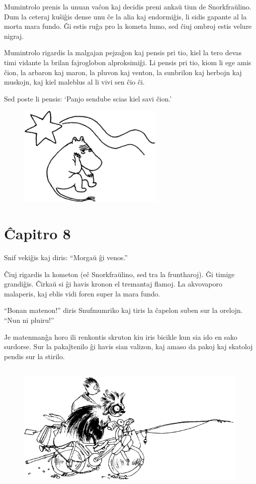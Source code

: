 Mumintrolo prenis la unuan vaĉon kaj decidis preni ankaŭ tiun de Snorkfraŭlino. Dum la ceteraj kuŝiĝis dense unu ĉe la alia kaj endormiĝis, li sidis gapante al la morta mara fundo. Ĝi estis ruĝa pro la kometa lumo, sed ĉiuj ombroj estis velure nigraj.

Mumintrolo rigardis la malgajan pejzaĝon kaj pensis pri tio, kiel la tero devas timi vidante la brilan fajroglobon alproksimiĝi. Li pensis pri tio, kiom li ege amis ĉion, la arbaron kaj maron, la pluvon kaj venton, la sunbrilon kaj herbojn kaj muskojn, kaj kiel maleblus al li vivi sen ĉio ĉi.

Sed poste li pensis: `Panjo sendube scias kiel savi ĉion.'

\begin{figure}[htbp]
\centering
\includegraphics[width=200pt,height=138pt]{7-9.png}
\caption{}
\label{7-9}
\end{figure}

\chapter*[Ĉapitro 8]{Ĉapitro 8}


Snif vekiĝis kaj diris: ``Morgaŭ ĝi venos.''

Ĉiuj rigardis la kometon (eĉ Snorkfraŭlino, sed tra la fruntharoj). Ĝi timige grandiĝis. Ĉirkaŭ si ĝi havis kronon el tremantaj flamoj. La akvovaporo malaperis, kaj eblis vidi foren super la mara fundo.

``Bonan matenon!'' diris Snufmumriko kaj tiris la ĉapelon suben sur la orelojn. ``Nun ni pluiru!''

Je matenmanĝa horo ili renkontis skruton kiu iris bicikle kun sia ido en sako surdorse. Sur la pakaĵtenilo ĝi havis sian valizon, kaj amaso da pakoj kaj skatoloj pendis sur la stirilo.

\begin{figure}[htbp]
\centering
\includegraphics[width=364pt,height=180pt]{8-1.png}
\caption{}
\label{8-1}
\end{figure}

